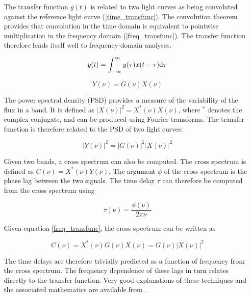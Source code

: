 \documentclass[11pt,letterpaper]{article}
\begin{document}
	The transfer function $g(t)$ is related to two light curves as being convoluted against the reference light curve (\ref{time_transfunc}). The convolution theorem provides that convolution in the time domain is equivalent to pointwise multiplication in the frequency domain (\ref{freq_transfunc}). The transfer function therefore lends itself well to frequency-domain analyses.

	\begin{equation}
		\label{time_transfunc}
		y(t) = \int_{-\infty}^{\infty} g(\tau) x(t-\tau)  {\rm d}\tau
	\end{equation}

	\begin{equation}
		\label{freq_transfunc}
		Y(\nu) = G(\nu) X(\nu)
	\end{equation}

    The power spectral density (PSD) provides a measure of the variability of the flux in a band. It is defined as $|X(\nu)|^2 = X^*(\nu)X(\nu)$, where $^*$ denotes the complex conjugate, and can be produced using Fourier transforms. The transfer function is therefore related to the PSD of two light curves:

    \begin{equation}
        |Y(\nu)|^2 = |G(\nu)|^2 |X(\nu)|^2
    \end{equation}

    Given two bands, a cross spectrum can also be computed. The cross spectrum is defined as $C(\nu) = X^*(\nu) Y(\nu)$. The argument $\phi$ of the cross spectrum is the phase lag between the two signals. The time delay $\tau$ can therefore be computed from the cross spectrum using
    
    \begin{equation}
        \tau(\nu) = \frac{\phi(\nu)}{2\pi\nu}
    \end{equation}

    Given equation \ref{freq_transfunc}, the cross spectrum can be written as
        
    \begin{equation}
        C(\nu) = X^*(\nu) G(\nu) X(\nu) =  G(\nu) |X(\nu)|^2 
    \end{equation}

    The time delays are therefore trivially predicted as a function of frequency from the cross spectrum. The frequency dependence of these lags in turn relates directly to the transfer function. Very good explanations of these techniques and the associated mathematics are available from \cite{2014A&ARv..22...72U}.
\end{document}
